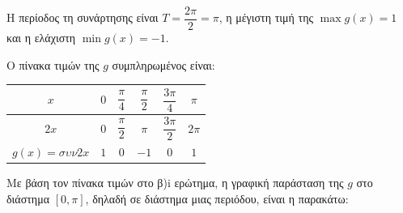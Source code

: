 \begin{alist}
\item Η περίοδος τη συνάρτησης είναι $T = \dfrac{2\pi}{2} = \pi$, η μέγιστη τιμή της $\max g(x) = 1$ και η ελάχιστη $\min g(x) = -1$.

\item
\begin{rlist}
\item Ο πίνακα τιμών της $g$ συμπληρωμένος είναι:
\begin{center}
\renewcommand{\arraystretch}{2}
\begin{tabular}{|c|c|c|c|c|c|}
\hline
$x$ & $0$ & $\dfrac{\pi}{4}$ & $\dfrac{\pi}{2}$ & $\dfrac{3\pi}{4}$ & $\pi$ \\ \hline
$2x$ & $0$ & $\dfrac{\pi}{2}$ & $\pi$ & $\dfrac{3\pi}{2}$ & $2\pi$ \\ \hline
$g(x) = \sigma\upsilon\nu 2x$ & $1$ & $0$ & $-1$ & $0$ & $1$ \\ \hline
\end{tabular}
\end{center}

\item Με βάση τον πίνακα τιμών στο β)i ερώτημα, η γραφική παράσταση της $g$ στο διάστημα $[0, \pi]$, δηλαδή σε διάστημα μιας περιόδου, είναι η παρακάτω:
\begin{center}
\end{center}
\end{rlist}
\end{alist}
